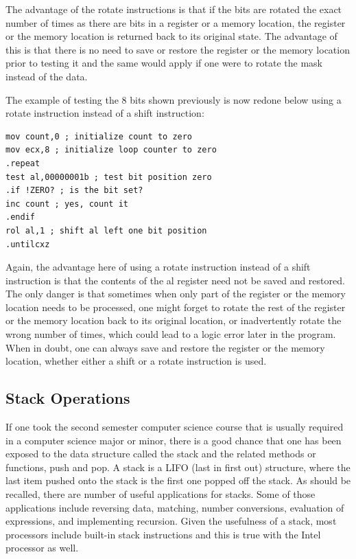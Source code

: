 \documentclass[10pt]{article}
\begin{document}
The advantage of the rotate instructions is that if the bits are rotated the exact number of times as there are bits in a register or a memory location, the register or the memory location is returned back to its original state. The advantage of this is that there is no need to save or restore the register or the memory location prior to testing it and the same would apply if one were to rotate the mask instead of the data.

The example of testing the 8 bits shown previously is now redone below using a rotate instruction instead of a shift instruction:

\begin{verbatim}
mov count,0 ; initialize count to zero
mov ecx,8 ; initialize loop counter to zero
.repeat
test al,00000001b ; test bit position zero
.if !ZERO? ; is the bit set?
inc count ; yes, count it
.endif
rol al,1 ; shift al left one bit position
.untilcxz
\end{verbatim}

Again, the advantage here of using a rotate instruction instead of a shift instruction is that the contents of the al register need not be saved and restored. The only danger is that sometimes when only part of the register or the memory location needs to be processed, one might forget to rotate the rest of the register or the memory location back to its original location, or inadvertently rotate the wrong number of times, which could lead to a logic error later in the program. When in doubt, one can always save and restore the register or the memory location, whether either a shift or a rotate instruction is used.

\subsection*{Stack Operations}
If one took the second semester computer science course that is usually required in a computer science major or minor, there is a good chance that one has been exposed to the data structure called the stack and the related methods or functions, push and pop. A stack is a LIFO (last in first out) structure, where the last item pushed onto the stack is the first one popped off the stack. As should be recalled, there are number of useful applications for stacks. Some of those applications include reversing data, matching, number conversions, evaluation of expressions, and implementing recursion. Given the usefulness of a stack, most processors include built-in stack instructions and this is true with the Intel processor as well.
\end{document}
